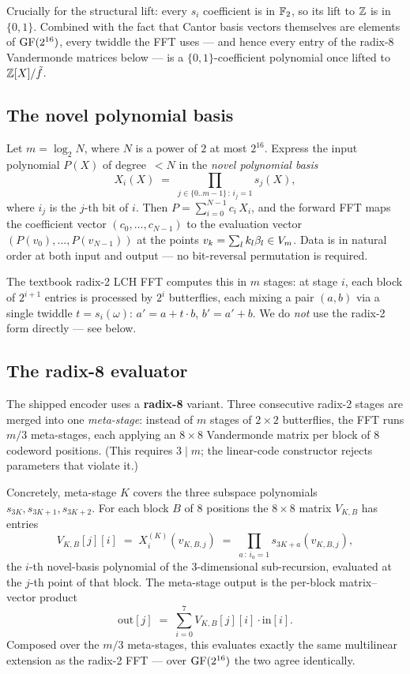 Crucially for the structural lift: every $s_i$ coefficient is in
$\mathbb{F}_2$, so its lift to $\mathbb{Z}$ is in $\{0, 1\}$. Combined with the fact
that Cantor basis vectors themselves are elements of $\operatorname{GF}(2^{16})$,
every twiddle the FFT uses --- and hence every entry of the radix-8
Vandermonde matrices below --- is a $\{0, 1\}$-coefficient polynomial
once lifted to $\mathbb{Z}[X]/\tilde f$.

\subsection{The novel polynomial basis}
\label{sec:lch}

Let $m = \log_2 N$, where $N$ is a power of $2$ at most $2^{16}$.
Express the input polynomial $P(X)$ of degree~$< N$ in the
\emph{novel polynomial basis}
\[
  X_i(X) \;=\; \prod_{j \in \{0..m-1\}\,:\, i_j = 1} s_j(X),
\]
where $i_j$ is the $j$-th bit of $i$. Then $P = \sum_{i=0}^{N-1} c_i \, X_i$,
and the forward FFT maps the coefficient vector
$(c_0, \ldots, c_{N-1})$ to the evaluation vector $(P(v_0), \ldots,
P(v_{N-1}))$ at the points $v_k = \sum_l k_l \beta_l \in V_m$. Data is
in natural order at both input and output --- no bit-reversal
permutation is required.

The textbook radix-2 LCH FFT computes this in $m$ stages: at stage $i$,
each block of $2^{i+1}$ entries is processed by $2^i$ butterflies, each
mixing a pair $(a,b)$ via a single twiddle $t = s_i(\omega)$:
$a' = a + t\cdot b$, $b' = a' + b$. We do \emph{not} use the radix-2
form directly --- see below.

\subsection{The radix-8 evaluator}
\label{sec:radix8}

The shipped encoder uses a \textbf{radix-8} variant. Three consecutive
radix-2 stages are merged into one \emph{meta-stage}: instead of
$m$ stages of $2\times 2$ butterflies, the FFT runs $m/3$ meta-stages,
each applying an $8 \times 8$ Vandermonde matrix per block of $8$
codeword positions. (This requires $3 \mid m$; the linear-code
constructor rejects parameters that violate it.)

Concretely, meta-stage $K$ covers the three subspace polynomials
$s_{3K}, s_{3K+1}, s_{3K+2}$. For each block $B$ of $8$ positions
the $8 \times 8$ matrix $V_{K,B}$ has entries
\[
  V_{K,B}[j][i] \;=\; X^{(K)}_i\!\left( v_{K,B,j} \right)
  \;=\;
  \prod_{a \,:\, i_a = 1} s_{3K+a}\!\left( v_{K,B,j} \right),
\]
the $i$-th novel-basis polynomial of the $3$-dimensional
sub-recursion, evaluated at the $j$-th point of that block. The
meta-stage output is the per-block matrix--vector product
\[
  \mathrm{out}[j] \;=\; \sum_{i=0}^{7} V_{K,B}[j][i] \cdot \mathrm{in}[i].
\]
Composed over the $m/3$ meta-stages, this evaluates exactly the same
multilinear extension as the radix-2 FFT --- over $\operatorname{GF}(2^{16})$ the two
agree identically.

